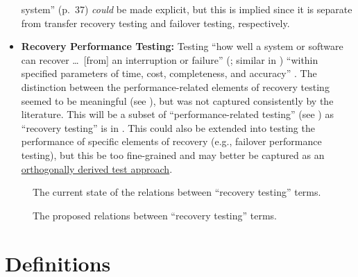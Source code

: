 \begin{itemize}
            system'' (p.~37) \emph{could} be made explicit, but this is implied
            since it is separate from transfer recovery testing and failover
            testing, respectively.
      \item \textbf{Recovery Performance Testing:} Testing ``how well a system or
            software can recover \dots\ [from] an interruption or failure''
            (\citealp[p.~7-10]{SWEBOK2024}; similar in \citealp{ISO_IEC2023a})
            ``within specified parameters of time, cost, completeness, and
            accuracy'' \citep[p.~2]{IEEE2013}. The distinction between the
            performance-related elements of recovery testing seemed to be
            meaningful (see ), but was not captured
            consistently by the literature. This will be a subset of
            ``performance-related testing'' (see )
            as ``recovery testing'' is in \citep[p.~22]{IEEE2022}. This could
            also be extended into testing the performance of specific elements
            of recovery (e.g., failover performance testing), but this be too
            fine-grained and may better be captured as an
            \hyperref[chap:testing:sec:orthogonal-tests]
            {orthogonally derived test approach}.
\end{itemize}

\begin{figure}[hbtp!]
      \centering
      \begin{minipage}{.5\textwidth}
            \centering
            \recoveryGraphCurrent{}
            \caption{The current state of the relations between ``recovery
                  testing'' terms.}
            \label{fig:recovery-graph-current}
      \end{minipage}%
      \begin{minipage}{.5\textwidth}
            \centering
            \recoveryGraphProposed{}
            \caption{The proposed relations between ``recovery testing'' terms.}
            \label{fig:recovery-graph-proposed}
      \end{minipage}
\end{figure}

\section{Definitions}

